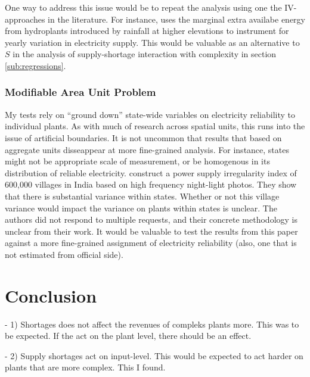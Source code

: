 \documentclass[11pt]{article}
\begin{document}
One way to address this issue would be to repeat the analysis using one the IV-approaches in the literature. For instance, \cite{allcott_how_2016} uses the marginal extra availabe energy from hydroplants introduced by rainfall at higher elevations to instrument for yearly variation in electricity supply. This would be valuable as an alternative to $S$ in the analysis of supply-shortage interaction with complexity in section \ref{sub:regressions}.

\subsubsection{Modifiable Area Unit Problem}
\label{sec:org4e3cc26}
My tests rely on ``ground down'' state-wide variables on electricity reliability to individual plants. As with much of research across spatial units, this runs into the issue of artificial boundaries. It is not uncommon that results that based on aggregate units disseappear at more fine-grained analysis. For instance, states might not be appropriate scale of measurement, or be homogenous in its distribution of reliable electricity. \cite{min_whose_2017-2} construct a power supply irregularity index of 600,000 villages in India based on high frequency night-light photos. They show that there is substantial variance within states. Whether or not this village variance would impact the variance on plants within states is unclear. The authors did not respond to multiple requests, and their concrete methodology is unclear from their work. It would be valuable to test the results from this paper against a more fine-grained assignment of electricity reliability (also, one that is not estimated from official side).


\newpage

\section{Conclusion}%
\label{sec:conclusion}

- 1) Shortages does not affect the revenues of compleks plants more. This was to be expected. If the act on the plant level, there should be an effect.

- 2) Supply shortages act on input-level. This would be expected to act harder on plants that are more complex. This I found.
\end{document}
